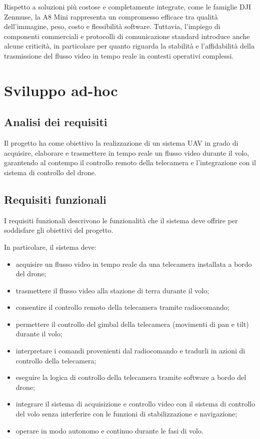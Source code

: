 Rispetto a soluzioni più costose e completamente integrate, come le famiglie DJI Zenmuse, la A8 Mini rappresenta un compromesso efficace tra qualità dell’immagine, peso, costo e flessibilità software. Tuttavia, l’impiego di componenti commerciali e protocolli di comunicazione standard introduce anche alcune criticità, in particolare per quanto riguarda la stabilità e l’affidabilità della trasmissione del flusso video in tempo reale in contesti operativi complessi.



\section{Sviluppo ad-hoc}

\subsection{Analisi dei requisiti}
Il progetto ha come obiettivo la realizzazione di un sistema UAV in grado di acquisire, elaborare e trasmettere in tempo reale un flusso video durante il volo, garantendo al contempo il controllo remoto della telecamera e l’integrazione con il sistema di controllo del drone.


\subsection{Requisiti funzionali}

I requisiti funzionali descrivono le funzionalità che il sistema deve offrire per soddisfare gli obiettivi del progetto.

In particolare, il sistema deve:
\begin{itemize}
    \item acquisire un flusso video in tempo reale da una telecamera installata a bordo del drone;
    \item trasmettere il flusso video alla stazione di terra durante il volo;
    \item consentire il controllo remoto della telecamera tramite radiocomando;
    \item permettere il controllo del gimbal della telecamera (movimenti di pan e tilt) durante il volo;
    \item interpretare i comandi provenienti dal radiocomando e tradurli in azioni di controllo della telecamera;
    \item eseguire la logica di controllo della telecamera tramite software a bordo del drone;
    \item integrare il sistema di acquisizione e controllo video con il sistema di controllo del volo senza interferire con le funzioni di stabilizzazione e navigazione;
    \item operare in modo autonomo e continuo durante le fasi di volo.
\end{itemize}

